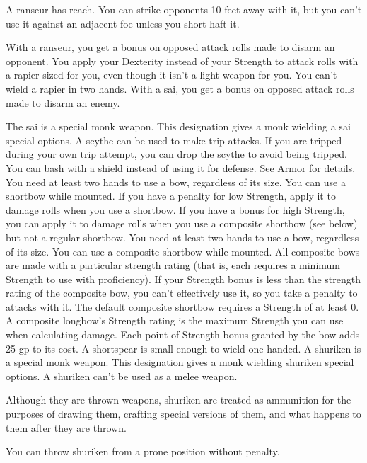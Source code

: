  A ranseur has reach. You can strike opponents 10 feet away with it, but you can't use it against an adjacent foe unless you short haft it.
\par With a ranseur, you get a  bonus on opposed attack rolls made to disarm an opponent.
 You apply your Dexterity instead of your Strength to attack rolls with a rapier sized for you, even though it isn't a light weapon for you. You can't wield a rapier in two hands.
 With a sai, you get a  bonus on opposed attack rolls made to disarm an enemy.
\par The sai is a special monk weapon. This designation gives a monk wielding a sai special options.
 A scythe can be used to make trip attacks. If you are tripped during your own trip attempt, you can drop the scythe to avoid being tripped.
 You can bash with a shield instead of using it for defense. See Armor for details.
 You need at least two hands to use a bow, regardless of its size. You can use a shortbow while mounted. If you have a penalty for low Strength, apply it to damage rolls when you use a shortbow. If you have a bonus for high Strength, you can apply it to damage rolls when you use a composite shortbow (see below) but not a regular shortbow.
 You need at least two hands to use a bow, regardless of its size. You can use a composite shortbow while mounted. All composite bows are made with a particular strength rating (that is, each requires a minimum Strength to use with proficiency). If your Strength bonus is less than the strength rating of the composite bow, you can't effectively use it, so you take a  penalty to attacks with it. The default composite shortbow requires a Strength of at least 0. A composite longbow's Strength rating is the maximum Strength you can use when calculating damage. Each point of Strength bonus granted by the bow adds 25 gp to its cost.
 A shortspear is small enough to wield one-handed.
 A shuriken is a special monk weapon. This designation gives a monk wielding shuriken special options. A shuriken can't be used as a melee weapon.
\par Although they are thrown weapons, shuriken are treated as ammunition for the purposes of drawing them, crafting special versions of them, and what happens to them after they are thrown. 
\par You can throw shuriken from a prone position without penalty.
